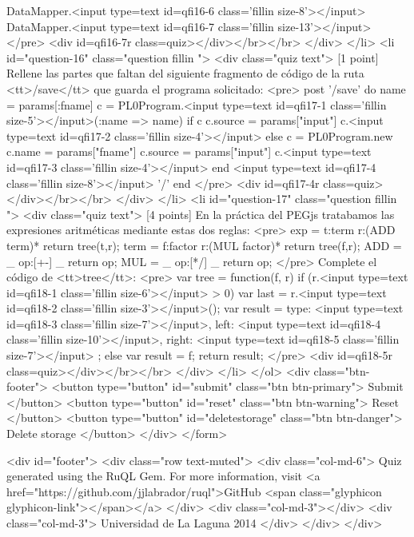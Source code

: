 \begin{rawhtml}
{  DataMapper.<input type=text id=qfi16-6 class='fillin size-8'></input>
  DataMapper.<input type=text id=qfi16-7 class='fillin size-13'></input>
</pre>
<div id=qfi16-7r class=quiz></div></br></br>      </div>
    </li>
    <li id="question-16" class="question fillin ">
      <div class="quiz text">
[1 point] 
Rellene las partes que faltan del siguiente fragmento de código
de la ruta <tt>/save</tt>
que guarda el programa solicitado:
<pre>
post '/save' do
  name = params[:fname]
  c  = PL0Program.<input type=text id=qfi17-1 class='fillin size-5'></input>(:name => name)
  if c
    c.source = params["input"]
    c.<input type=text id=qfi17-2 class='fillin size-4'></input>
  else
    c = PL0Program.new
    c.name = params["fname"]
    c.source = params["input"]
    c.<input type=text id=qfi17-3 class='fillin size-4'></input>
  end
  <input type=text id=qfi17-4 class='fillin size-8'></input> '/'
end
</pre>
<div id=qfi17-4r class=quiz></div></br></br>      </div>
    </li>
    <li id="question-17" class="question fillin ">
      <div class="quiz text">
[4 points] 
En la práctica del PEGjs tratabamos las expresiones aritméticas 
mediante estas dos reglas:
<pre>
exp    = t:term   r:(ADD term)*   { return tree(t,r); }
term   = f:factor r:(MUL factor)* { return tree(f,r); }
ADD      = _ op:[+-] _ { return op; }
MUL      = _ op:[*/] _ { return op; }
</pre>
Complete el código de <tt>tree</tt>:
<pre>
{
  var tree = function(f, r) {
    if (r.<input type=text id=qfi18-1 class='fillin size-6'></input> > 0) {
      var last = r.<input type=text id=qfi18-2 class='fillin size-3'></input>();
      var result = {
        type:  <input type=text id=qfi18-3 class='fillin size-7'></input>,
        left: <input type=text id=qfi18-4 class='fillin size-10'></input>,
        right: <input type=text id=qfi18-5 class='fillin size-7'></input>
      };
    }
    else {
      var result = f;
    }
    return result;
  }
}
</pre>
<div id=qfi18-5r class=quiz></div></br></br>      </div>
    </li>
  </ol>
  <div class="btn-footer">
    <button type="button" id="submit" class="btn btn-primary">
Submit    </button>
    <button type="button" id="reset" class="btn btn-warning">
Reset    </button>
    <button type="button" id="deletestorage" class="btn btn-danger">
Delete storage    </button>
  </div>
</form>

      
        <div id="footer">
          <div class="row text-muted">
            <div class="col-md-6">
              Quiz generated using the RuQL Gem. For more information, visit <a href="https://github.com/jjlabrador/ruql">GitHub
              <span class="glyphicon glyphicon-link"></span></a>
            </div>
            <div class="col-md-3"></div>
            <div class="col-md-3">
              Universidad de La Laguna 2014
            </div>
          </div>
        </div>
      
}
\end{rawhtml}
